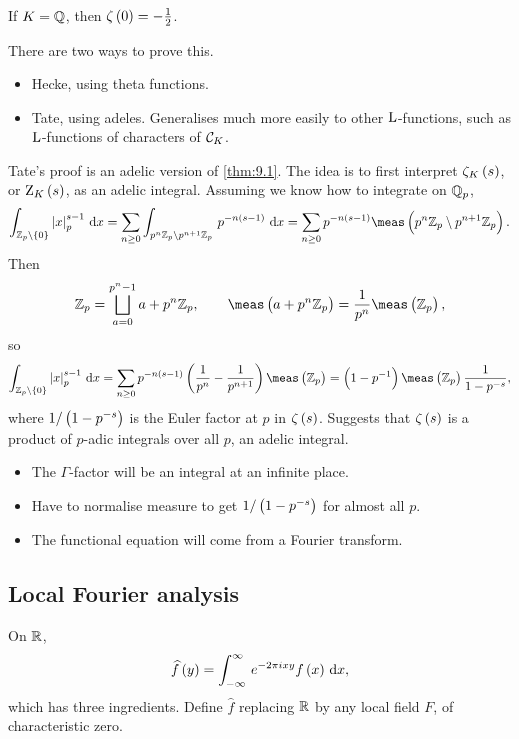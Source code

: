 \begin{example*}
If $ K = \mathbb{Q} $, then $ \zeta\br{0} = -\tfrac{1}{2} $.
\end{example*}

There are two ways to prove this.
\begin{itemize}
\item Hecke, using theta functions.
\item Tate, using adeles. Generalises much more easily to other $ \mathrm{L} $-functions, such as $ \mathrm{L} $-functions of characters of $ \mathcal{C}_K $.
\end{itemize}

\pagebreak

Tate's proof is an adelic version of \ref{thm:9.1}. The idea is to first interpret $ \zeta_K\br{s} $, or $ \Z_K\br{s} $, as an adelic integral. Assuming we know how to integrate on $ \mathbb{Q}_p $,
$$ \intd{\ZZ_p \setminus \cbr{0}}{}{\abs{x}_p^{s - 1}}{x} = \sum_{n \ge 0} \intd{p^n\ZZ_p \setminus p^{n + 1}\ZZ_p}{}{p^{-n\br{s - 1}}}{x} = \sum_{n \ge 0} p^{-n\br{s - 1}}\meas\br{p^n\ZZ_p \setminus p^{n + 1}\ZZ_p}. $$
Then
$$ \ZZ_p = \bigsqcup_{a = 0}^{p^n - 1} a + p^n\ZZ_p, \qquad \meas\br{a + p^n\ZZ_p} = \dfrac{1}{p^n}\meas\br{\ZZ_p}, $$
so
$$ \intd{\ZZ_p \setminus \cbr{0}}{}{\abs{x}_p^{s - 1}}{x} = \sum_{n \ge 0} p^{-n\br{s - 1}}\br{\dfrac{1}{p^n} - \dfrac{1}{p^{n + 1}}}\meas\br{\ZZ_p} = \br{1 - p^{-1}}\meas\br{\ZZ_p}\dfrac{1}{1 - p^{-s}}, $$
where $ 1 / \br{1 - p^{-s}} $ is the Euler factor at $ p $ in $ \zeta\br{s} $. Suggests that $ \zeta\br{s} $ is a product of $ p $-adic integrals over all $ p $, an adelic integral.
\begin{itemize}
\item The $ \Gamma $-factor will be an integral at an infinite place.
\item Have to normalise measure to get $ 1 / \br{1 - p^{-s}} $ for almost all $ p $.
\item The functional equation will come from a Fourier transform.
\end{itemize}

\subsection{Local Fourier analysis}

On $ \mathbb{R} $,
$$ \widehat{f}\br{y} = \intd{-\infty}{\infty}{e^{-2\pi ixy}f\br{x}}{x}, $$
which has three ingredients. Define $ \widehat{f} $ replacing $ \mathbb{R} $ by any local field $ F $, of characteristic zero.

